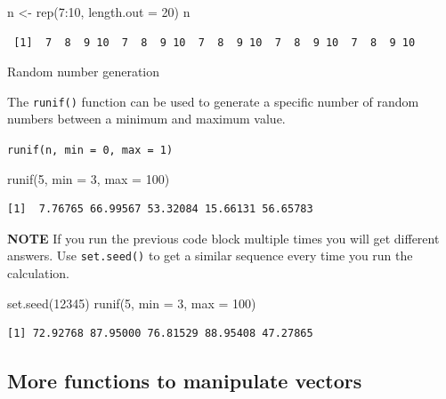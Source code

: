 \documentclass[
  letterpaper,
  DIV=11,
  numbers=noendperiod]{scrreprt}
\newenvironment{Shaded}{\begin{snugshade}}{\end{snugshade}}
\newcommand{\AttributeTok}[1]{\textcolor[rgb]{0.40,0.45,0.13}{#1}}
\newcommand{\DecValTok}[1]{\textcolor[rgb]{0.68,0.00,0.00}{#1}}
\newcommand{\FunctionTok}[1]{\textcolor[rgb]{0.28,0.35,0.67}{#1}}
\newcommand{\NormalTok}[1]{\textcolor[rgb]{0.00,0.23,0.31}{#1}}
\newcommand{\OtherTok}[1]{\textcolor[rgb]{0.00,0.23,0.31}{#1}}
\newcommand{\SpecialCharTok}[1]{\textcolor[rgb]{0.37,0.37,0.37}{#1}}
\begin{document}
\begin{Shaded}
\begin{Highlighting}[]
\NormalTok{n }\OtherTok{\textless{}{-}} \FunctionTok{rep}\NormalTok{(}\DecValTok{7}\SpecialCharTok{:}\DecValTok{10}\NormalTok{, }\AttributeTok{length.out =} \DecValTok{20}\NormalTok{)}
\NormalTok{n}
\end{Highlighting}
\end{Shaded}

\begin{verbatim}
 [1]  7  8  9 10  7  8  9 10  7  8  9 10  7  8  9 10  7  8  9 10
\end{verbatim}

Random number generation

The \texttt{runif()} function can be used to generate a specific number
of random numbers between a minimum and maximum value.

\texttt{runif(n,\ min\ =\ 0,\ max\ =\ 1)}

\begin{Shaded}
\begin{Highlighting}[]
\FunctionTok{runif}\NormalTok{(}\DecValTok{5}\NormalTok{, }\AttributeTok{min =} \DecValTok{3}\NormalTok{, }\AttributeTok{max =} \DecValTok{100}\NormalTok{)}
\end{Highlighting}
\end{Shaded}

\begin{verbatim}
[1]  7.76765 66.99567 53.32084 15.66131 56.65783
\end{verbatim}

\textbf{NOTE} If you run the previous code block multiple times you will
get different answers. Use \texttt{set.seed()} to get a similar sequence
every time you run the calculation.

\begin{Shaded}
\begin{Highlighting}[]
\FunctionTok{set.seed}\NormalTok{(}\DecValTok{12345}\NormalTok{)}
\FunctionTok{runif}\NormalTok{(}\DecValTok{5}\NormalTok{, }\AttributeTok{min =} \DecValTok{3}\NormalTok{, }\AttributeTok{max =} \DecValTok{100}\NormalTok{)}
\end{Highlighting}
\end{Shaded}

\begin{verbatim}
[1] 72.92768 87.95000 76.81529 88.95408 47.27865
\end{verbatim}

\subsection{More functions to manipulate
vectors}\label{more-functions-to-manipulate-vectors}
\end{document}
